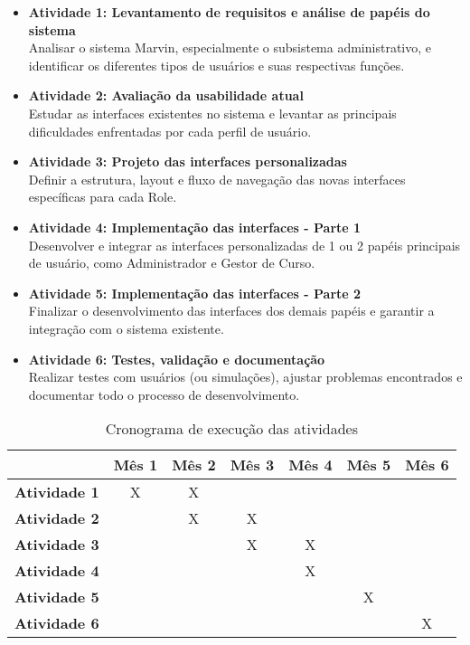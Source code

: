 \begin{itemize}
	\item \textbf{Atividade 1: Levantamento de requisitos e análise de papéis do sistema} \\
	Analisar o sistema Marvin, especialmente o subsistema administrativo, e identificar os diferentes tipos de usuários e suas respectivas funções.
	
	\item \textbf{Atividade 2: Avaliação da usabilidade atual} \\
	Estudar as interfaces existentes no sistema e levantar as principais dificuldades enfrentadas por cada perfil de usuário.
	
	\item \textbf{Atividade 3: Projeto das interfaces personalizadas} \\
	Definir a estrutura, layout e fluxo de navegação das novas interfaces específicas para cada Role.
	
	\item \textbf{Atividade 4: Implementação das interfaces - Parte 1} \\
	Desenvolver e integrar as interfaces personalizadas de 1 ou 2 papéis principais de usuário, como Administrador e Gestor de Curso.
	
	\item \textbf{Atividade 5: Implementação das interfaces - Parte 2} \\
	Finalizar o desenvolvimento das interfaces dos demais papéis e garantir a integração com o sistema existente.
	
	\item \textbf{Atividade 6: Testes, validação e documentação} \\
	Realizar testes com usuários (ou simulações), ajustar problemas encontrados e documentar todo o processo de desenvolvimento.
\end{itemize}

\begin{table}[h]
	\centering
	\caption{Cronograma de execução das atividades}
	\begin{tabular}{l|c|c|c|c|c|c|}
		\cline{2-7}
		\multicolumn{1}{c|}{} & \textbf{Mês 1} & \textbf{Mês 2} & \textbf{Mês 3} & \textbf{Mês 4} & \textbf{Mês 5} & \textbf{Mês 6} \\ \hline
		\multicolumn{1}{|l|}{\textbf{Atividade 1}} & X & X &  &  &  &  \\ \hline
		\multicolumn{1}{|l|}{\textbf{Atividade 2}} &  & X & X &  &  &  \\ \hline
		\multicolumn{1}{|l|}{\textbf{Atividade 3}} &  &  & X & X &  &  \\ \hline
		\multicolumn{1}{|l|}{\textbf{Atividade 4}} &  &  &  & X &  &  \\ \hline
		\multicolumn{1}{|l|}{\textbf{Atividade 5}} &  &  &  &   & X &  \\ \hline
		\multicolumn{1}{|l|}{\textbf{Atividade 6}} &  &  &  &  &  & X \\ \hline
	\end{tabular}
\end{table}